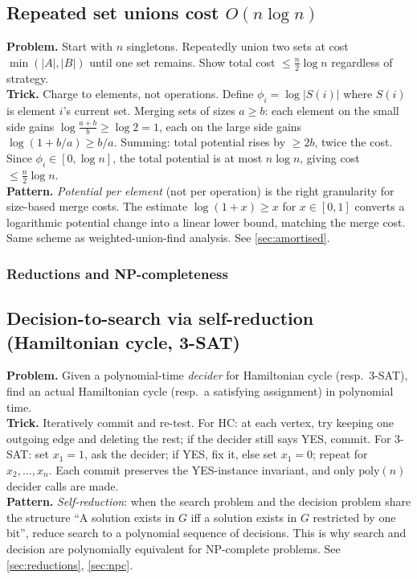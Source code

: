 \subsection{Repeated set unions cost \texorpdfstring{$O(n \log n)$}{O(n log n)}}
\textbf{Problem.} Start with $n$ singletons. Repeatedly union two sets at cost $\min(|A|,|B|)$ until one set remains. Show total cost $\leq \tfrac{n}{2} \log n$ regardless of strategy.\\
\textbf{Trick.} Charge to elements, not operations. Define $\phi_i = \log|S(i)|$ where $S(i)$ is element $i$'s current set. Merging sets of sizes $a \geq b$: each element on the small side gains $\log\frac{a+b}{b} \geq \log 2 = 1$, each on the large side gains $\log(1 + b/a) \geq b/a$. Summing: total potential rises by $\geq 2b$, twice the cost. Since $\phi_i \in [0, \log n]$, the total potential is at most $n \log n$, giving cost $\leq \tfrac{n}{2}\log n$.\\
\textbf{Pattern.} \emph{Potential per element} (not per operation) is the right granularity for size-based merge costs. The estimate $\log(1+x) \geq x$ for $x \in [0,1]$ converts a logarithmic potential change into a linear lower bound, matching the merge cost. Same scheme as weighted-union-find analysis. See \cref{sec:amortised}.

\subsubsection*{Reductions and NP-completeness}

\subsection{Decision-to-search via self-reduction (Hamiltonian cycle, 3-SAT)}
\textbf{Problem.} Given a polynomial-time \emph{decider} for Hamiltonian cycle (resp.\ 3-SAT), find an actual Hamiltonian cycle (resp.\ a satisfying assignment) in polynomial time.\\
\textbf{Trick.} Iteratively commit and re-test. For HC: at each vertex, try keeping one outgoing edge and deleting the rest; if the decider still says YES, commit. For 3-SAT: set $x_1 \!=\! 1$, ask the decider; if YES, fix it, else set $x_1 \!=\! 0$; repeat for $x_2, \ldots, x_n$. Each commit preserves the YES-instance invariant, and only $\mathrm{poly}(n)$ decider calls are made.\\
\textbf{Pattern.} \emph{Self-reduction}: when the search problem and the decision problem share the structure ``A solution exists in $G$ iff a solution exists in $G$ restricted by one bit'', reduce search to a polynomial sequence of decisions. This is why search and decision are polynomially equivalent for NP-complete problems. See \cref{sec:reductions}, \cref{sec:npc}.

